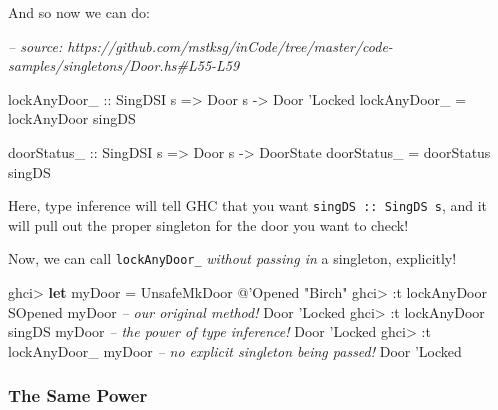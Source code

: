 \documentclass[]{article}
\newenvironment{Shaded}{}{}
\newcommand{\CommentTok}[1]{\textcolor[rgb]{0.38,0.63,0.69}{\textit{#1}}}
\newcommand{\DataTypeTok}[1]{\textcolor[rgb]{0.56,0.13,0.00}{#1}}
\newcommand{\FunctionTok}[1]{\textcolor[rgb]{0.02,0.16,0.49}{#1}}
\newcommand{\KeywordTok}[1]{\textcolor[rgb]{0.00,0.44,0.13}{\textbf{#1}}}
\newcommand{\NormalTok}[1]{#1}
\newcommand{\OtherTok}[1]{\textcolor[rgb]{0.00,0.44,0.13}{#1}}
\newcommand{\StringTok}[1]{\textcolor[rgb]{0.25,0.44,0.63}{#1}}
\begin{document}
And so now we can do:

\begin{Shaded}
\begin{Highlighting}[]
\CommentTok{-- source: https://github.com/mstksg/inCode/tree/master/code-samples/singletons/Door.hs#L55-L59}

\OtherTok{lockAnyDoor_ ::} \DataTypeTok{SingDSI}\NormalTok{ s }\OtherTok{=>} \DataTypeTok{Door}\NormalTok{ s }\OtherTok{->} \DataTypeTok{Door}\NormalTok{ '}\DataTypeTok{Locked}
\NormalTok{lockAnyDoor_ }\FunctionTok{=}\NormalTok{ lockAnyDoor singDS}

\OtherTok{doorStatus_ ::} \DataTypeTok{SingDSI}\NormalTok{ s }\OtherTok{=>} \DataTypeTok{Door}\NormalTok{ s }\OtherTok{->} \DataTypeTok{DoorState}
\NormalTok{doorStatus_ }\FunctionTok{=}\NormalTok{ doorStatus singDS}
\end{Highlighting}
\end{Shaded}

Here, type inference will tell GHC that you want \texttt{singDS\ ::\ SingDS\ s},
and it will pull out the proper singleton for the door you want to check!

Now, we can call \texttt{lockAnyDoor\_} \emph{without passing in} a singleton,
explicitly!

\begin{Shaded}
\begin{Highlighting}[]
\NormalTok{ghci}\FunctionTok{>} \KeywordTok{let}\NormalTok{ myDoor }\FunctionTok{=} \DataTypeTok{UnsafeMkDoor} \FunctionTok{@}\NormalTok{'}\DataTypeTok{Opened} \StringTok{"Birch"}
\NormalTok{ghci}\FunctionTok{>} \FunctionTok{:}\NormalTok{t lockAnyDoor }\DataTypeTok{SOpened}\NormalTok{ myDoor }\CommentTok{-- our original method!}
\DataTypeTok{Door}\NormalTok{ '}\DataTypeTok{Locked}
\NormalTok{ghci}\FunctionTok{>} \FunctionTok{:}\NormalTok{t lockAnyDoor singDS myDoor  }\CommentTok{-- the power of type inference!}
\DataTypeTok{Door}\NormalTok{ '}\DataTypeTok{Locked}
\NormalTok{ghci}\FunctionTok{>} \FunctionTok{:}\NormalTok{t lockAnyDoor_ myDoor        }\CommentTok{-- no explicit singleton being passed!}
\DataTypeTok{Door}\NormalTok{ '}\DataTypeTok{Locked}
\end{Highlighting}
\end{Shaded}

\hypertarget{the-same-power}{%
\subsubsection{The Same Power}\label{the-same-power}}
\end{document}
